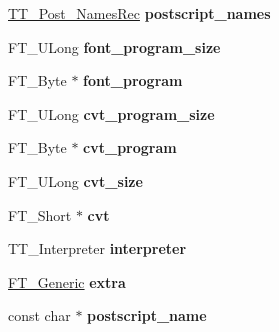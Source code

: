 \begin{DoxyCompactItemize}
\item 
\hypertarget{struct_t_t___face_rec___a875e8db9ffdf04b9e157c801c56921d0}{
\hyperlink{struct_t_t___post___names_rec__}{TT\_\-Post\_\-NamesRec} {\bfseries postscript\_\-names}}
\label{struct_t_t___face_rec___a875e8db9ffdf04b9e157c801c56921d0}

\item 
\hypertarget{struct_t_t___face_rec___ae0f510b460d6af3d62ce4c6b83247a39}{
FT\_\-ULong {\bfseries font\_\-program\_\-size}}
\label{struct_t_t___face_rec___ae0f510b460d6af3d62ce4c6b83247a39}

\item 
\hypertarget{struct_t_t___face_rec___a74268c6131bd14019910ad63e465231d}{
FT\_\-Byte $\ast$ {\bfseries font\_\-program}}
\label{struct_t_t___face_rec___a74268c6131bd14019910ad63e465231d}

\item 
\hypertarget{struct_t_t___face_rec___aeebca91e7b062ab0d1e149fb45257a6d}{
FT\_\-ULong {\bfseries cvt\_\-program\_\-size}}
\label{struct_t_t___face_rec___aeebca91e7b062ab0d1e149fb45257a6d}

\item 
\hypertarget{struct_t_t___face_rec___a6644124501481504fb315ba0395caa25}{
FT\_\-Byte $\ast$ {\bfseries cvt\_\-program}}
\label{struct_t_t___face_rec___a6644124501481504fb315ba0395caa25}

\item 
\hypertarget{struct_t_t___face_rec___a7508fd247ba7dba3087d09be4be7ebe4}{
FT\_\-ULong {\bfseries cvt\_\-size}}
\label{struct_t_t___face_rec___a7508fd247ba7dba3087d09be4be7ebe4}

\item 
\hypertarget{struct_t_t___face_rec___a191980a2e844052d746ea2e6432e927f}{
FT\_\-Short $\ast$ {\bfseries cvt}}
\label{struct_t_t___face_rec___a191980a2e844052d746ea2e6432e927f}

\item 
\hypertarget{struct_t_t___face_rec___a98b686a62bd5c8f45963a5c8742c095d}{
TT\_\-Interpreter {\bfseries interpreter}}
\label{struct_t_t___face_rec___a98b686a62bd5c8f45963a5c8742c095d}

\item 
\hypertarget{struct_t_t___face_rec___ab1ffe97c9ad4f20c71069b6b9bf005ee}{
\hyperlink{struct_f_t___generic__}{FT\_\-Generic} {\bfseries extra}}
\label{struct_t_t___face_rec___ab1ffe97c9ad4f20c71069b6b9bf005ee}

\item 
\hypertarget{struct_t_t___face_rec___a6e331e306d911cb437665b1b79b9a810}{
const char $\ast$ {\bfseries postscript\_\-name}}
\label{struct_t_t___face_rec___a6e331e306d911cb437665b1b79b9a810}


\end{DoxyCompactItemize}

